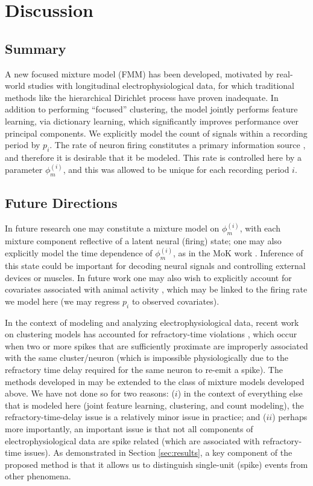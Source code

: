 \documentclass[journal]{IEEEtran}
\begin{document}
\section{Discussion}\label{sec:conclusions}

\subsection{Summary} %
\label{sub:summary}

A new focused mixture model (FMM) has been developed, motivated by real-world studies with longitudinal electrophysiological data, for which traditional methods like the hierarchical Dirichlet process have proven inadequate. In addition to performing ``focused'' clustering, the model jointly performs feature learning, via dictionary learning, which significantly improves performance over principal components. We explicitly model the count of signals within a recording period {by $p_i$}. The rate of neuron firing constitutes a primary information source \cite{Donoghue07}, and therefore it is desirable that it be modeled. This rate is controlled here by a parameter {$\phi_m^{(i)}$}, and this was allowed to be unique for each recording period $i$. 


\subsection{Future Directions} %
\label{sub:future_directions}

In future research one may constitute a mixture model on {$\phi_m^{(i)}$}, with each mixture component reflective of a latent neural (firing) state; one may also explicitly model the time dependence of {$\phi_m^{(i)}$}{, as in the MoK work} \cite{Calabrese2010}. Inference of this state could be important for decoding neural signals and controlling external devices or muscles. In future work one may also wish to explicitly account for covariates associated with animal activity \cite{Ventura}, which may be linked to the firing rate we model here (we may regress $p_i$ to observed covariates).


In the context of modeling and analyzing electrophysiological data, recent work on clustering models has accounted for refractory-time
violations \cite{Wood2009,Calabrese2010,Bo2011}, which occur when two or more spikes that
are sufficiently proximate are improperly associated with the same
cluster/neuron (which is impossible physiologically due to the refractory time delay
required for the same neuron to re-emit a spike). The methods developed in \cite{Wood2009,Bo2011} may be extended to the class of mixture models developed above. We have not done so for two reasons: ($i$) in the context of everything else that is modeled here (joint feature learning, clustering, and count modeling), the refractory-time-delay issue is a relatively minor issue in practice; and ($ii$) perhaps more importantly, an important issue is that not all components of electrophysiological data are spike related (which are associated with refractory-time issues). As demonstrated in Section \ref{sec:results}, a key component of the proposed method is that it allows us to distinguish single-unit (spike) events from other phenomena.
\end{document}
